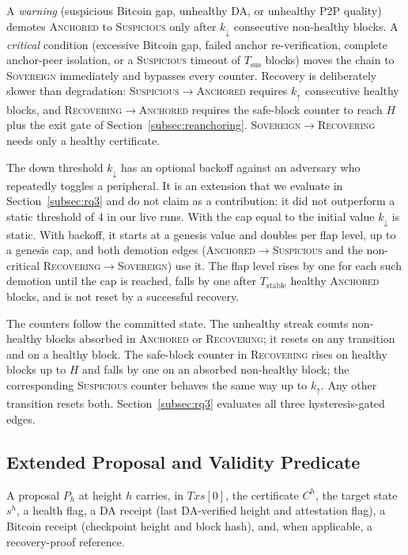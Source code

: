 A \emph{warning} (suspicious Bitcoin gap, unhealthy DA, or unhealthy P2P
quality) demotes \textsc{Anchored} to \textsc{Suspicious} only after
$k_{\downarrow}$ consecutive non-healthy blocks. A \emph{critical} condition
(excessive Bitcoin gap, failed anchor re-verification, complete anchor-peer
isolation, or a \textsc{Suspicious} timeout of $T_{\text{sus}}$ blocks) moves
the chain to \textsc{Sovereign} immediately and bypasses every counter.
Recovery is deliberately slower than degradation:
\textsc{Suspicious}$\to$\textsc{Anchored} requires $k_{\uparrow}$ consecutive
healthy blocks, and \textsc{Recovering}$\to$\textsc{Anchored} requires the
safe-block counter to reach $H$ plus the exit gate of
Section~\ref{subsec:reanchoring}. \textsc{Sovereign}$\to$\textsc{Recovering}
needs only a healthy certificate.

The down threshold $k_{\downarrow}$ has an optional backoff against an adversary
who repeatedly toggles a peripheral. It is an extension that we evaluate in
Section~\ref{subsec:rq3} and do not claim as a contribution: it did not outperform a
static threshold of 4 in our live runs. With the cap equal to the initial value
$k_{\downarrow}$ is static. With backoff, it starts at a genesis value and
doubles per flap level, up to a genesis cap, and both demotion edges
(\textsc{Anchored}$\to$\textsc{Suspicious} and the non-critical
\textsc{Recovering}$\to$\textsc{Sovereign}) use it. The flap level rises by
one for each such demotion until the cap is reached, falls by one after
$T_{\text{stable}}$ healthy \textsc{Anchored} blocks, and is not reset by a
successful recovery.

The counters follow the committed state. The unhealthy streak counts
non-healthy blocks absorbed in \textsc{Anchored} or \textsc{Recovering}; it
resets on any transition and on a healthy block. The safe-block counter in
\textsc{Recovering} rises on healthy blocks up to $H$ and falls by one on an
absorbed non-healthy block; the corresponding \textsc{Suspicious} counter
behaves the same way up to $k_{\uparrow}$. Any other transition resets both.
Section~\ref{subsec:rq3} evaluates all three hysteresis-gated edges.

\subsection{Extended Proposal and Validity Predicate}
\label{subsec:proposal}

A proposal $P_h$ at height $h$ carries, in $\mathit{Txs}[0]$, the certificate
$C^{h}$, the target state $s^{h}$, a health flag, a DA receipt (last
DA-verified height and attestation flag), a Bitcoin receipt (checkpoint
height and block hash), and, when applicable, a recovery-proof reference.

